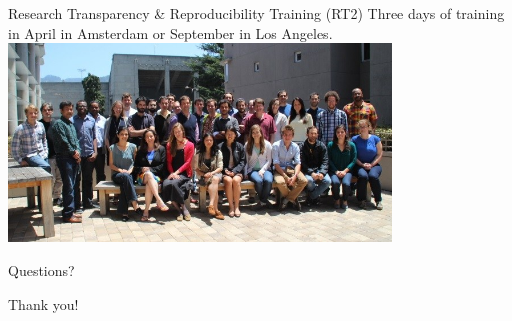 \documentclass{beamer}
\begin{document}
\begin{frame}{Research Transparency \& Reproducibility Training (RT2)}
Three days of training in April in Amsterdam or September in Los Angeles.
\includegraphics[width=4in]{../Images/bitss-2014-cohort2.jpg}
\end{frame}

%
%


\begin{frame}
\begin{center}
Questions?
\vspace{1in}


\Huge{Thank you!}
\end{center}
\end{frame}
\end{document}
